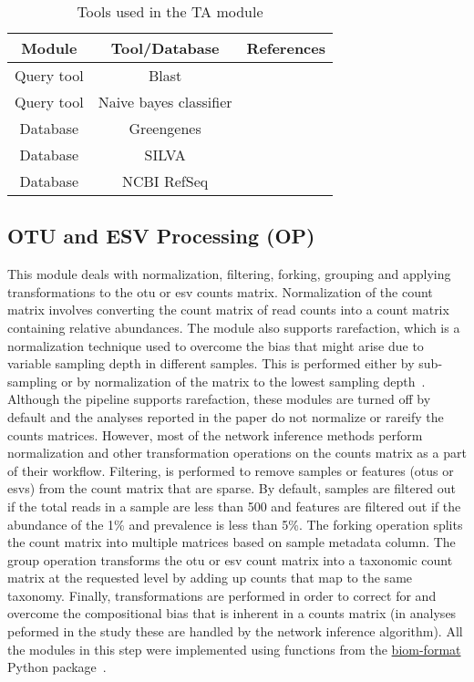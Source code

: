   \begin{table}[h]
    \centering
    \small
    \begin{tabular}{|c|c|c|}
      \hline
      \textbf{Module} & \textbf{Tool/Database} & \textbf{References} \\
      \hline
      Query tool & Blast & \cite{camachoBLASTArchitectureApplications2009,bokulichOptimizingTaxonomicClassification2018} \\
      Query tool & Naive bayes classifier & \cite{bokulichOptimizingTaxonomicClassification2018} \\
      \hline
      Database & Greengenes & \cite{DeSantis2006} \\
      Database & SILVA & \cite{Quast2012} \\
      Database & NCBI RefSeq & \cite{Sayers2009} \\
      \hline
    \end{tabular}
    \caption{Tools used in the TA module}
    \label{tab:ta_tools}
  \end{table}

  \subsection*{OTU and ESV Processing (OP)}
  \vspace{-5mm}
  This module deals with normalization, filtering, forking, grouping and applying transformations to the \ac{otu} or \ac{esv} counts matrix.
  Normalization of the count matrix involves converting the count matrix of read counts into a count matrix containing relative abundances.
  The module also supports rarefaction, which is a normalization technique used to overcome the bias that might arise due to variable sampling depth in different samples.
  This is performed either by sub-sampling or by normalization of the matrix to the lowest sampling depth~\cite{Weiss2015}.
  Although the pipeline supports rarefaction, these modules are turned off by default and the analyses reported in the paper do not normalize or rareify the counts matrices.
  However, most of the network inference methods perform normalization and other transformation operations on the counts matrix as a part of their workflow.
  Filtering, is performed to remove samples or features (\ac{otu}s or \ac{esv}s) from the count matrix that are sparse.
  By default, samples are filtered out if the total reads in a sample are less than 500 and features are filtered out if the abundance of the 1\% and prevalence is less than 5\%.
  The forking operation splits the count matrix into multiple matrices based on sample metadata column.
  The group operation transforms the \ac{otu} or \ac{esv} count matrix into a taxonomic count matrix at the requested level by adding up counts that map to the same taxonomy.
  Finally, transformations are performed in order to correct for and overcome the compositional bias that is inherent in a counts matrix (in analyses peformed in the study these are handled by the network inference algorithm).
  All the modules in this step were implemented using functions from the \href{http://biom-format.org/}{biom-format} Python package~\cite{mcdonaldBiologicalObservationMatrix2012}.

